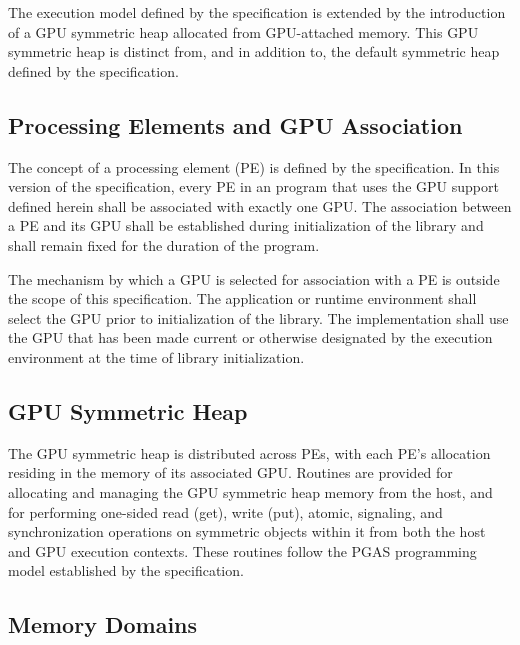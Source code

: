 
The execution model defined by the \openshmem specification is extended by the
introduction of a \ac{GPU} symmetric heap allocated from GPU-attached memory.
This \ac{GPU} symmetric heap is distinct from, and in addition to, the default
symmetric heap defined by the \openshmem specification.

\subsection{Processing Elements and GPU Association}\label{subsec:pe_gpu_association}

The concept of a processing element (\ac{PE}) is defined by the \openshmem
specification. In this version of the specification, every \ac{PE} in an
\openshmem program that uses the GPU support defined herein shall be associated
with exactly one \ac{GPU}. The association between a \ac{PE} and its \ac{GPU}
shall be established during initialization of the \openshmem library and shall
remain fixed for the duration of the program.

The mechanism by which a \ac{GPU} is selected for association with a \ac{PE} is
outside the scope of this specification. The application or runtime environment
shall select the \ac{GPU} prior to initialization of the \openshmem library. The
\openshmem implementation shall use the \ac{GPU} that has been made current or
otherwise designated by the execution environment at the time of library
initialization.

\subsection{GPU Symmetric Heap}\label{subsec:gpu_symmetric_heap}

The \ac{GPU} symmetric heap is distributed across \acp{PE}, with each \ac{PE}'s
allocation residing in the memory of its associated \ac{GPU}. Routines are
provided for allocating and managing the \ac{GPU} symmetric heap memory from the host,
and for performing one-sided read (get), write (put), atomic, signaling, and synchronization
operations on symmetric objects within it from both the host and \ac{GPU}
execution contexts. These routines follow the \ac{PGAS} programming model
established by the \openshmem specification.

\subsection{Memory Domains}\label{subsec:memory_domains}

